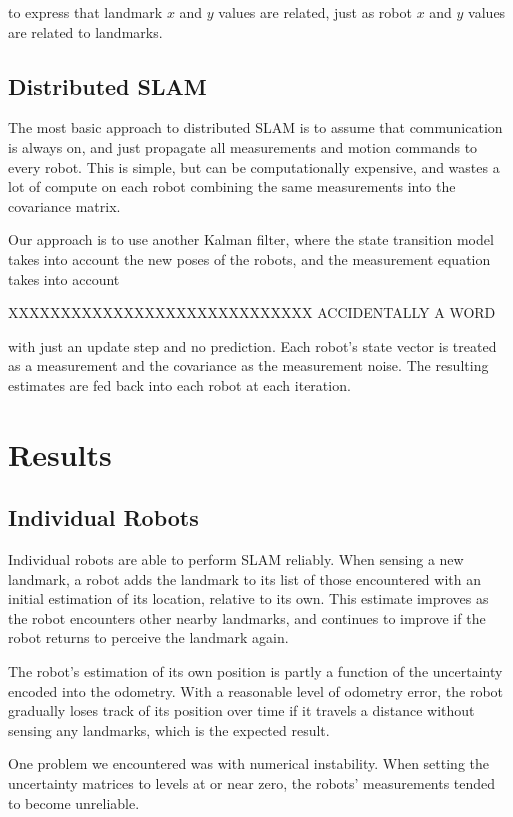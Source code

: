 \documentclass[prodmode,acmtecs]{acmsmall} %
\begin{document}
to express that landmark $x$ and $y$ values are related, just as robot $x$ and $y$ values are related to landmarks.

\subsection{Distributed SLAM}

The most basic approach to distributed SLAM is to assume that communication is always on, and just propagate all measurements and motion commands to every robot. This is simple, but can be computationally expensive, and wastes a lot of compute on each robot combining the same measurements into the covariance matrix.

Our approach is to use another Kalman filter, where the state transition model takes into account the new poses of the robots, and the measurement equation takes into account

XXXXXXXXXXXXXXXXXXXXXXXXXXXXX ACCIDENTALLY A WORD

with just an update step and no prediction.  Each robot's state vector is treated as a measurement and the covariance as the measurement noise. The resulting estimates are fed back into each robot at each iteration.

\section{Results}

\subsection{Individual Robots}

Individual robots are able to perform SLAM reliably.  When sensing a new landmark, a robot adds the landmark to its list of those encountered with an initial estimation of its location, relative to its own.  This estimate improves as the robot encounters other nearby landmarks, and continues to improve if the robot returns to perceive the landmark again.

The robot's estimation of its own position is partly a function of the uncertainty encoded into the odometry.  With a reasonable level of odometry error, the robot gradually loses track of its position over time if it travels a distance without sensing any landmarks, which is the expected result.

One problem we encountered was with numerical instability.  When setting the uncertainty matrices to levels at or near zero, the robots' measurements tended to become unreliable.  
\end{document}
